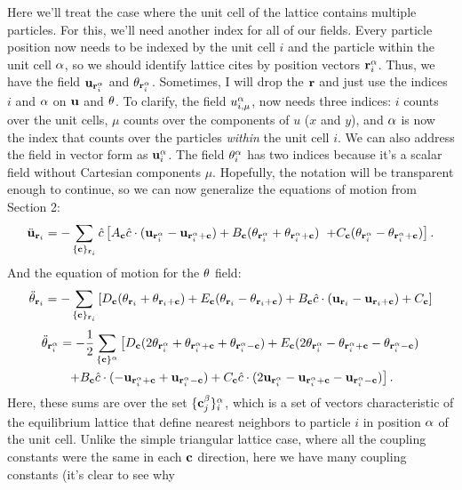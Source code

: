 \documentclass[12pt]{article}
\begin{document}
Here we'll treat the case where the unit cell of the lattice contains multiple 
particles. For this, we'll need another index for all of our fields. Every 
particle position now needs to be indexed by the unit cell $i$ and the 
particle within the unit cell $\alpha$, so we should identify lattice cites by 
position vectors $\mathbf{r}_i^\alpha$. Thus, we have the field $\mathbf{u}_{\mathbf{r}_i^\alpha}$ and 
$\theta_{\mathbf{r}_i^\alpha}$. Sometimes, I will drop the $\mathbf{r}$ and just use the indices 
$i$ and $\alpha$ on $\mathbf{u}$ and $\theta$. To clarify, the field $u_{i,\mu}^\alpha$, now 
needs three indices: $i$ counts over the unit cells, $\mu$ counts over the 
components of $u$ ($x$ and $y$), and $\alpha$ is now the index that counts over the 
particles \emph{within} the unit cell $i$. We can also address the field in 
vector form as $\mathbf{u}_i^\alpha$. The field $\theta_{i}^\alpha$ has two indices because it's 
a scalar field without Cartesian components $\mu$. Hopefully, the notation 
will be transparent enough to continue, so we can now generalize the equations 
of motion from Section 2:
\[ \ddot {\mathbf{u}}_{\mathbf{r}_i} = -\sum_{\{\mathbf{c}\}_{\mathbf{r}_i}} \hat c  \left [   A_{\mathbf{c}} \hat c \cdot  (\mathbf{u}_{\mathbf{r}_i^\alpha} - \mathbf{u}_{\mathbf{r}_i^\alpha + \mathbf{c}})  + 
B_{\mathbf{c}}(\theta_{\mathbf{r}_i^\alpha} + \theta_{\mathbf{r}_i^\alpha + \mathbf{c}}) 
\right. \\ \left.+ C_{\mathbf{c}} (\theta_{\mathbf{r}_i^\alpha} - \theta_{\mathbf{r}_i^\alpha +\mathbf{c}})   
\right].\]
And the equation of motion for the $\theta$ field:
\[ \ddot {\theta}_{\mathbf{r}_i} = -\sum_{\{\mathbf{c}\}_{\mathbf{r}_i} } \left [D_{\mathbf{c}}(\theta_{\mathbf{r}_i} 
+\theta_{\mathbf{r}_i + \mathbf{c}}) + E_{\mathbf{c}} (\theta_{\mathbf{r}_i} - \theta_{\mathbf{r}_i + \mathbf{c}}) + B_{\mathbf{c}} \hat c \cdot (\mathbf{u}_{\mathbf{r}_i} - \mathbf{u}_{\mathbf{r}_i +\mathbf{c}} ) + C_{\mathbf{c}}   \right ]  
  \]
\begin{multline*}   \ddot {\theta}_{\mathbf{r}_i^\alpha} = -\frac{1}{2} \sum_{\{\mathbf{c}\}^\alpha} 
\left [ D_{\mathbf{c}} (2\theta_{\mathbf{r}_i^\alpha} + \theta_{\mathbf{r}_i^\alpha + \mathbf{c}} + 
\theta_{\mathbf{r}_i^\alpha - \mathbf{c}}) + E_{\mathbf{c}}(2\theta_{\mathbf{r}_i^\alpha} - \theta_{\mathbf{r}_i^\alpha + 
\mathbf{c}} - \theta_{\mathbf{r}_i^\alpha - \mathbf{c}}) \right. \\ \left. + B_{\mathbf{c}} 
\hat c \cdot (- \mathbf{u}_{\mathbf{r}_i^\alpha + \mathbf{c}} + \mathbf{u}_{\mathbf{r}_i^\alpha - \mathbf{c}}) + C_{\mathbf{c}} \hat c \cdot (2\mathbf{u}_{\mathbf{r}_i^\alpha} - \mathbf{u}_{\mathbf{r}_i^\alpha 
+ \mathbf{c}} - \mathbf{u}_{\mathbf{r}_i^\alpha - \mathbf{c}}) \right ]. \end{multline*}
Here, these sums are over the set $\{\mathbf{c}_j^\beta \}_i^\alpha$, which is a set of 
vectors characteristic of the equilibrium lattice that define nearest 
neighbors to particle $i$ in position $\alpha$ of the unit cell. Unlike the simple 
triangular lattice case, where all the coupling constants were the same in each 
$\mathbf{c}$ direction, here we have many coupling constants (it's clear to see why 
\end{document}
